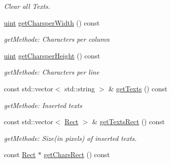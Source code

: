 \begin{DoxyCompactItemize}
\begin{DoxyCompactList}\small\item\em Clear all Texts. \item\end{DoxyCompactList}\item 
\hypertarget{class_f2_c_1_1_font_sprite_a81bce69eb04c048d007d98262e916824}{
\hyperlink{namespace_f2_c_a58be2bac9eb3e3c99cb41b6008bf4fae}{uint} \hyperlink{class_f2_c_1_1_font_sprite_a81bce69eb04c048d007d98262e916824}{getCharsperWidth} () const }
\label{class_f2_c_1_1_font_sprite_a81bce69eb04c048d007d98262e916824}

\begin{DoxyCompactList}\small\item\em getMethode: Characters per column \item\end{DoxyCompactList}\item 
\hypertarget{class_f2_c_1_1_font_sprite_abd03d3df667c51e99608a7e3cb7ba775}{
\hyperlink{namespace_f2_c_a58be2bac9eb3e3c99cb41b6008bf4fae}{uint} \hyperlink{class_f2_c_1_1_font_sprite_abd03d3df667c51e99608a7e3cb7ba775}{getCharsperHeight} () const }
\label{class_f2_c_1_1_font_sprite_abd03d3df667c51e99608a7e3cb7ba775}

\begin{DoxyCompactList}\small\item\em getMethode: Characters per line \item\end{DoxyCompactList}\item 
\hypertarget{class_f2_c_1_1_font_sprite_a3c086bec1f7abf0fc457b2499c69774a}{
const std::vector$<$ std::string $>$ \& \hyperlink{class_f2_c_1_1_font_sprite_a3c086bec1f7abf0fc457b2499c69774a}{getTexts} () const }
\label{class_f2_c_1_1_font_sprite_a3c086bec1f7abf0fc457b2499c69774a}

\begin{DoxyCompactList}\small\item\em getMethode: Inserted texts \item\end{DoxyCompactList}\item 
\hypertarget{class_f2_c_1_1_font_sprite_a38b3c9b85b6ec46d903a38b5619255c1}{
const std::vector$<$ \hyperlink{class_f2_c_1_1_rect}{Rect} $>$ \& \hyperlink{class_f2_c_1_1_font_sprite_a38b3c9b85b6ec46d903a38b5619255c1}{getTextsRect} () const }
\label{class_f2_c_1_1_font_sprite_a38b3c9b85b6ec46d903a38b5619255c1}

\begin{DoxyCompactList}\small\item\em getMethode: Size(in pixels) of inserted texts. \item\end{DoxyCompactList}\item 
\hypertarget{class_f2_c_1_1_font_sprite_a1beebb4264be624bafc96126bde7eeec}{
const \hyperlink{class_f2_c_1_1_rect}{Rect} $\ast$ \hyperlink{class_f2_c_1_1_font_sprite_a1beebb4264be624bafc96126bde7eeec}{getCharsRect} () const }
\label{class_f2_c_1_1_font_sprite_a1beebb4264be624bafc96126bde7eeec}


\end{DoxyCompactItemize}
